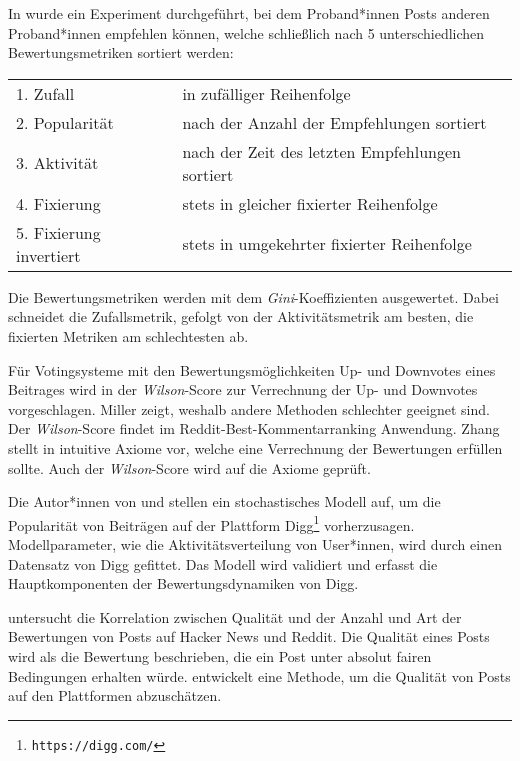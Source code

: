 In \cite{Lerman2014} wurde ein Experiment durchgeführt, bei dem Proband*innen Posts anderen Proband*innen empfehlen können, welche schließlich nach 5 unterschiedlichen Bewertungsmetriken sortiert werden: 

\begin{table}[!htbp]
	\begin{tabularx}{\textwidth}{lX}
		1. Zufall &in zufälliger Reihenfolge\\
		2. Popularität&nach der Anzahl der Empfehlungen sortiert \\
		3. Aktivität &nach der Zeit des letzten Empfehlungen sortiert\\ 
		4. Fixierung&stets in gleicher fixierter Reihenfolge\\
		5. Fixierung invertiert &stets in umgekehrter fixierter Reihenfolge
	\end{tabularx}
\end{table}

Die Bewertungsmetriken werden mit dem \textit{Gini}-Koeffizienten ausgewertet. Dabei schneidet die Zufallsmetrik, gefolgt von der Aktivitätsmetrik am besten, die fixierten Metriken am schlechtesten ab.

Für Votingsysteme mit den Bewertungsmöglichkeiten Up- und Downvotes eines Beitrages wird in \cite{miller} der \textit{Wilson}-Score zur Verrechnung der Up- und Downvotes vorgeschlagen. Miller zeigt, weshalb andere Methoden schlechter geeignet sind. Der \textit{Wilson}-Score findet im Reddit-Best-Kommentarranking Anwendung. Zhang stellt in \cite{Zhang2011238} intuitive Axiome vor, welche eine Verrechnung der Bewertungen erfüllen sollte. Auch der \textit{Wilson}-Score wird auf die Axiome geprüft.

Die Autor*innen von \cite{Hogg20121} und \cite{Lerman2010621} stellen ein stochastisches Modell auf, um die Popularität von Beiträgen auf der Plattform Digg\footnote{\texttt{https://digg.com/}} vorherzusagen. Modellparameter, wie die Aktivitätsverteilung von User*innen, wird durch einen Datensatz von Digg gefittet. Das Modell wird validiert und erfasst die Hauptkomponenten der Bewertungsdynamiken von Digg.

\cite{Stoddard2015416} untersucht die Korrelation zwischen Qualität und der Anzahl und Art der Bewertungen von Posts auf Hacker News und Reddit. Die Qualität eines Posts wird als die Bewertung beschrieben, die ein Post unter absolut fairen Bedingungen erhalten würde. \citeauthor{Stoddard2015416} entwickelt eine Methode, um die Qualität von Posts auf den Plattformen abzuschätzen.

